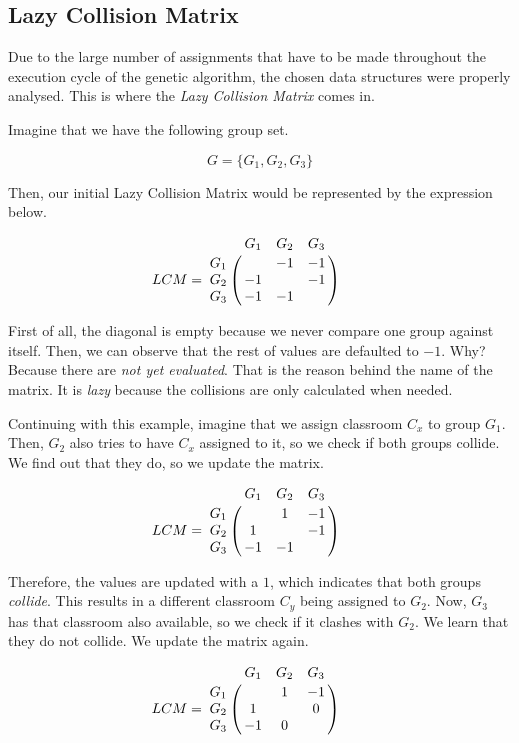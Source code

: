 \subsection{Lazy Collision Matrix}\label{lcm}

Due to the large number of assignments that have to be made throughout the execution cycle of the genetic algorithm, the chosen data structures were properly analysed. This is where the \textit{Lazy Collision Matrix} comes in.

Imagine that we have the following group set.

\begin{equation}
    G = \{ G_{1}, G_{2}, G_{3} \}
\end{equation}

Then, our initial Lazy Collision Matrix would be represented by the expression below.

\begin{equation}
    LCM = \bordermatrix{
        & G_{1} & G_{2} & G_{3} \cr
        G_{1} &  & -1 & -1 \cr
        G_{2} & -1 &  & -1 \cr
        G_{3} & -1 & -1 & 
    } \qquad
\end{equation}

First of all, the diagonal is empty because we never compare one group against itself. Then, we can observe that the rest of values are defaulted to $-1$. Why? Because there are \textit{not yet evaluated}. That is the reason behind the name of the matrix. It is \textit{lazy} because the collisions are only calculated when needed.

Continuing with this example, imagine that we assign classroom $C_{x}$ to group $G_{1}$. Then, $G_{2}$ also tries to have $C_{x}$ assigned to it, so we check if both groups collide. We find out that they do, so we update the matrix.

\begin{equation}
    LCM = \bordermatrix{
        & G_{1} & G_{2} & G_{3} \cr
        G_{1} &  & 1 & -1 \cr
        G_{2} & 1 &  & -1 \cr
        G_{3} & -1 & -1 & 
    } \qquad
\end{equation}

Therefore, the values are updated with a $1$, which indicates that both groups \textit{collide}. This results in a different classroom $C_{y}$ being assigned to $G_{2}$. Now, $G_{3}$ has that classroom also available, so we check if it clashes with $G_{2}$. We learn that they do not collide. We update the matrix again.

\begin{equation}
    LCM = \bordermatrix{
        & G_{1} & G_{2} & G_{3} \cr
        G_{1} &  & 1 & -1 \cr
        G_{2} & 1 &  & 0 \cr
        G_{3} & -1 & 0 & 
    } \qquad
\end{equation}

